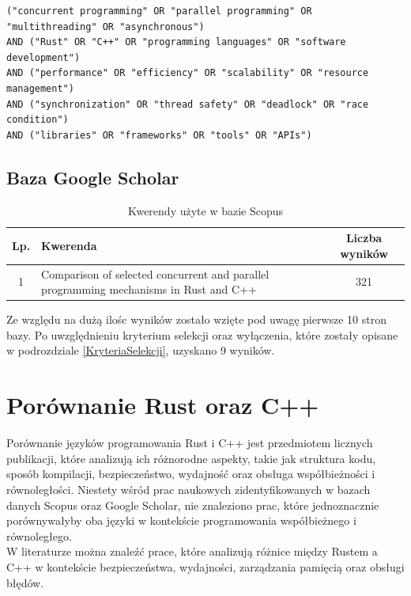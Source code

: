 \lstset{breaklines=true}
\begin{lstlisting}[caption=Kwerenda wygenerowana przez AI, label=AIQuery]
("concurrent programming" OR "parallel programming" OR "multithreading" OR "asynchronous")
AND ("Rust" OR "C++" OR "programming languages" OR "software development")
AND ("performance" OR "efficiency" OR "scalability" OR "resource management")
AND ("synchronization" OR "thread safety" OR "deadlock" OR "race condition")
AND ("libraries" OR "frameworks" OR "tools" OR "APIs")
\end{lstlisting}

\subsection{Baza Google Scholar}
\begin{table}[H]
    \caption{Kwerendy użyte w bazie Scopus \protect \footnotemark}
    \label{table:literatureReviewQueries}
    \begin{tabular}{|c|p{11cm}|c|}
    \hline
    Lp. & Kwerenda & Liczba wyników \\ \hline
    1 & Comparison of selected concurrent and parallel programming mechanisms in Rust and C++ & 321 \\ \hline

    \end{tabular}
\end{table}
Ze względu na dużą ilośc wyników zostało wzięte pod uwagę pierwsze 10 stron bazy. Po uwzględnieniu kryterium selekcji oraz wyłączenia, które zostały opisane w podrozdziale \ref{KryteriaSelekcji}, uzyskano 9 wyników.\\

\section{Porównanie Rust oraz C++}
Porównanie języków programowania Rust i C++ jest przedmiotem licznych publikacji, które analizują ich różnorodne aspekty, takie jak struktura kodu, sposób kompilacji, bezpieczeństwo, wydajność oraz obsługa współbieżności i równoległości. Niestety wśród prac naukowych zidentyfikowanych w bazach danych Scopus oraz Google Scholar, nie znaleziono prac, które jednoznacznie porównywałyby oba języki w kontekście programowania współbieżnego i równoległego.\\
W literaturze można znaleźć prace, które analizują różnice między Rustem a C++ w kontekście bezpieczeństwa, wydajności, zarządzania pamięcią oraz obsługi błędów.


